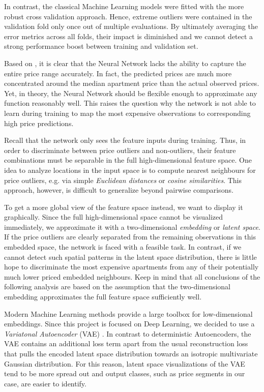 In contrast, the classical Machine Learning models were fitted with the more robust cross validation approach.
Hence, extreme outliers were contained in the validation fold only once out of multiple evaluations.
By ultimately averaging the error metrics across all folds, their impact is diminished and we cannot detect a strong performance boost between training and validation set.

Based on , it is clear that the Neural Network lacks the ability to capture the entire price range accurately.
In fact, the predicted prices are much more concentrated around the median apartment price than the actual observed prices.
Yet, in theory, the Neural Network should be flexible enough to approximate any function reasonably well.
This raises the question why the network is not able to learn during training to map the most expensive observations to corresponding high price predictions.

Recall that the network only sees the feature inputs during training.
Thus, in order to discriminate between price outliers and non-outliers, their feature combinations must be separable in the full high-dimensional feature space.
One idea to analyze locations in the input space is to compute nearest neighbours for price outliers, e.g. via simple \emph{Euclidean distances} or \emph{cosine similarities}.
This approach, however, is difficult to generalize beyond pairwise comparisons.

To get a more global view of the feature space instead, we want to display it graphically.
Since the full high-dimensional space cannot be visualized immediately, we approximate it with a two-dimensional \emph{embedding} or \emph{latent space}.
If the price outliers are clearly separated from the remaining observations in this embedded space, the network is faced with a feasible task.
In contrast, if we cannot detect such spatial patterns in the latent space distribution, there is little hope to discriminate the most expensive apartments from any of their potentially much lower priced embedded neighbours.
Keep in mind that all conclusions of the following analysis are based on the assumption that the two-dimensional embedding approximates the full feature space sufficiently well.

Modern Machine Learning methods provide a large toolbox for low-dimensional embeddings.
Since this project is focused on Deep Learning, we decided to use a \emph{Variatonal Autoencoder} (VAE) \citep{kingma2014}.
In contrast to deterministic Autoencoders, the VAE contains an additional loss term apart from the usual reconstruction loss that pulls the encoded latent space distribution towards an isotropic multivariate Gaussian distribution.
For this reason, latent space visualizations of the VAE tend to be more spread out and output classes, such as price segments in our case, are easier to identify.

